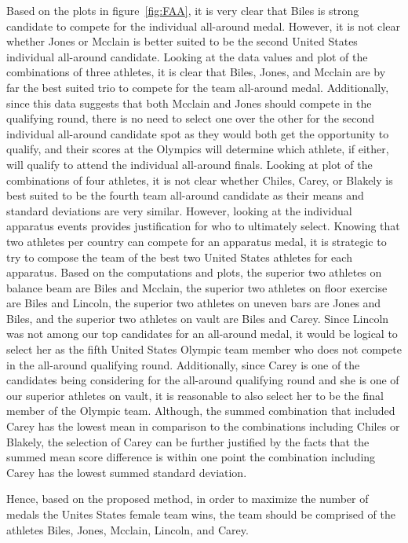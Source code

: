 \documentclass[12pt]{article}
\begin{document}
Based on the plots in figure~\ref{fig:FAA}, it is very clear that Biles is strong candidate to 
compete for the individual all-around medal. However, it is not clear whether Jones or Mcclain is better suited 
to be the second United States individual all-around candidate. Looking at the data values and plot of the combinations of three athletes, 
it is clear that Biles, Jones, and Mcclain are by far the best suited trio to compete for the team all-around medal. 
Additionally, since this data suggests that both Mcclain and Jones should compete in the qualifying round, there 
is no need to select one over the other for the second individual all-around candidate spot as they would both get 
the opportunity to qualify, and their scores at the Olympics will determine which athlete, if either, will qualify 
to attend the individual all-around finals. Looking at plot of the combinations of four athletes, it is not clear whether Chiles, Carey, or 
Blakely is best suited to be the fourth team all-around candidate as their means and standard deviations are very 
similar. However, looking at the individual apparatus events provides justification for who to ultimately select. 
Knowing that two athletes per country can compete for an apparatus medal, it is strategic to try to compose the 
team of the best two United States athletes for each apparatus. Based on the computations and plots, the superior two 
athletes on balance beam are Biles and Mcclain, the superior two athletes on floor exercise are Biles and Lincoln, 
the superior two athletes on uneven bars are Jones and Biles, and the superior two athletes on vault are Biles 
and Carey. Since Lincoln was not among our top candidates for an all-around medal, it would be logical to select her 
as the fifth United States Olympic team member who does not compete in the all-around qualifying round. Additionally, 
since Carey is one of the candidates being considering for the all-around qualifying round and she is one of our superior 
athletes on vault, it is reasonable to also select her to be the final member of the Olympic team. Although, the 
summed combination that included Carey has the lowest mean in comparison to the combinations including Chiles or 
Blakely, the selection of Carey can be further justified by the facts that the summed mean score difference is 
within one point the combination including Carey has the lowest summed standard deviation.

Hence, based on the proposed method, in order to maximize the number of medals the Unites States female team wins, 
the team should be comprised of the athletes Biles, Jones, Mcclain, Lincoln, and Carey.
 
\end{document}

